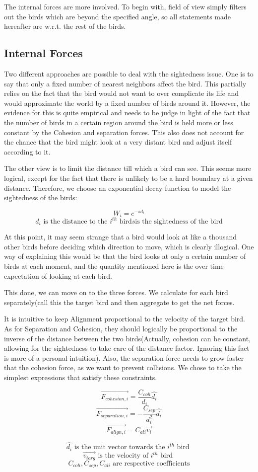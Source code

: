 \documentclass{article}
\begin{document}
The internal forces are more involved. To begin with, field of view simply filters out the birds which are beyond the specified angle, so all statements made hereafter are w.r.t. the rest of the birds.

\subsection{Internal Forces}
Two different approaches are possible to deal with the sightedness issue. One is to say that only a fixed number of nearest neighbors affect the bird. This partially relies on the fact that the bird would not want to over complicate its life and would approximate the world by a fixed number of birds around it. However, the evidence for this is quite empirical and needs to be judge in light of the fact that the number of birds in a certain region around the bird is held more or less constant by the Cohesion and separation forces. This also does not account for the chance that the bird might look at a very distant bird and adjust itself according to it.

The other view is to limit the distance till which a bird can see. This seems more logical, except for the fact that there is unlikely to be a hard boundary at a given distance. Therefore, we choose an exponential decay function to model the sightedness of the birds:
\begin{center}
$$W_i=e^{-sd_i}$$
\[
    d_i \text{ is the distance to the } i^{th} \text{ bird}
    s \text{is the sightedness of the bird}
\]
\end{center}
At this point, it may seem strange that a bird would look at like a thousand other birds before deciding which direction to move, which is clearly illogical. One way of explaining this would be that the bird looks at only a certain number of birds at each moment, and the quantity mentioned here is the over time expectation of looking at each bird.

This done, we can move on to the three forces. We calculate for each bird separately(call this the target bird and then aggregate to get the net forces.

It is intuitive to keep Alignment proportional to the velocity of the target bird. As for Separation and Cohesion, they should logically be proportional to the inverse of the distance between the two birds(Actually, cohesion can be constant, allowing for the sightedness to take care of the distance factor. Ignoring this fact is more of a personal intuition). Also, the separation force needs to grow faster that the cohesion force, as we want to prevent collisions. We chose to take the simplest expressions that satisfy these constraints.
\begin{center}
$$\vec{F_{cohesion,i}}=\frac{C_{coh}}{d_i} \hat{d_i}$$
$$\vec{F_{separation,i}}=-\frac{C_{sep}}{d_i^2} \hat{d_i}$$
$$\vec{F_{align,i}}=C_{ali}\vec{v_{i}}$$

$$\hat{d_i} \text{ is the unit vector towards the } i^{th} \text{ bird }$$
$$\vec{v_{targ}} \text{ is the velocity of } i^{th} \text{ bird }$$
$$C_{coh},C_{sep},C_{ali} \text{ are respective coefficients}$$ 
\end{center}
\end{document}
